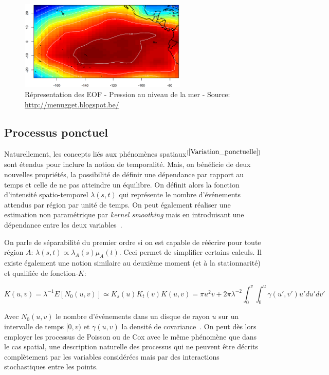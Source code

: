 \begin{figure}[h]
\includegraphics[width=8cm]{Representation/EOF}
\centering
\caption{Répresentation des EOF - Pression au niveau de la mer - Source: \url{http://menugget.blogspot.be/}}
\end{figure}

\subsection{Processus ponctuel}

Naturellement, les concepts liés aux phénomènes spatiaux$^{[\ref{Variation_ponctuelle}]}$ sont étendus pour inclure la notion de temporalité. Mais, on bénéficie de deux nouvelles propriétés, la possibilité de définir une dépendance par rapport au temps et celle de ne pas atteindre un équilibre. On définit alors la fonction d'intensité spatio-temporel $ \lambda(s, t) $ qui représente le nombre d'événements attendus par région par unité de temps. On peut également réaliser une estimation non paramétrique par \textit{kernel smoothing} mais en introduisant une dépendance entre les deux variables~\cite{diggle1985kernel}.

On parle de séparabilité du premier ordre si on est capable de réécrire pour toute région $A$: $ \lambda(s, t) \propto \lambda_{A}(s) \mu_{A}(t) $. Ceci permet de simplifier certains calculs. Il existe également une notion similaire au deuxième moment (et à la stationnarité) et qualifiée de fonction-$K$:

\begin{equation}
    K(u, v) = \lambda^{-1} E[N_{0}(u, v)] \simeq K_{s}(u) K_{t}(v) 
    K(u, v) = \pi u^{2} v + 2 \pi \lambda^{-2} \int_{0}^{v} \int_{0}^{u} \gamma(u', v') u' du' dv'
\end{equation}

Avec $N_{0}(u, v)$ le nombre d'événements dans un disque de rayon $u$ sur un intervalle de temps $[0, v)$ et $\gamma(u, v)$ la densité de covariance~\cite{gabriel2009second}. On peut dès lors employer les processus de Poisson ou de Cox avec le même phénomène que dans le cas spatial, une description naturelle des processus qui ne peuvent être décrits complètement par les variables considérées mais par des interactions stochastiques entre les points.

